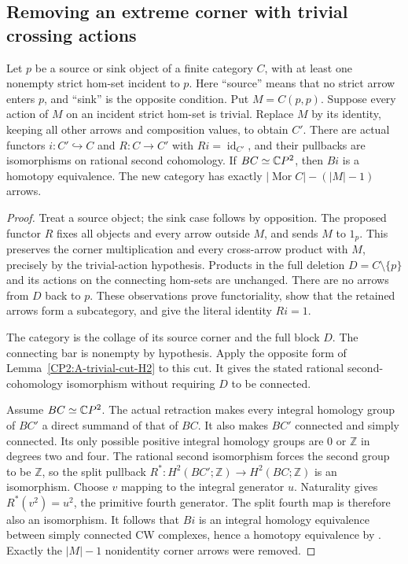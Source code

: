 \subsection{Removing an extreme corner with trivial crossing actions}

\begin{theorem}
\label{CP2:A-trivial-extreme-corner-retract}
Let $p$ be a source or sink object of a finite category $C$,
with at least one nonempty strict hom-set incident to $p$.
Here ``source'' means that no strict arrow enters $p$, and
``sink'' is the opposite condition. Put $M=C(p,p)$.
Suppose every action of $M$ on an incident strict hom-set
is trivial. Replace $M$ by its identity, keeping all other
arrows and composition values, to obtain $C'$. There are
actual functors $i:C'\hookrightarrow C$ and $R:C\to C'$
with $Ri=\operatorname{id}_{C'}$, and their pullbacks are
isomorphisms on rational second cohomology. If
$BC\simeq\mathbb{C}P^2$, then $Bi$ is a homotopy equivalence.
The new category has exactly $|\operatorname{Mor}C|-(|M|-1)$
arrows.
\end{theorem}
\begin{proof}
Treat a source object; the sink case follows by opposition.
The proposed functor $R$ fixes all objects and every arrow
outside $M$, and sends $M$ to $1_p$. This preserves the
corner multiplication and every cross-arrow product with
$M$, precisely by the trivial-action hypothesis. Products
in the full deletion $D=C\setminus\{p\}$ and its actions
on the connecting hom-sets are unchanged. There are no
arrows from $D$ back to $p$. These observations prove
functoriality, show that the retained arrows form a
subcategory, and give the literal identity $Ri=1$.

The category is the collage of its source corner and the
full block $D$. The connecting bar is nonempty by hypothesis.
Apply the opposite form of Lemma~\ref{CP2:A-trivial-cut-H2}
to this cut. It gives the stated rational second-cohomology
isomorphism without requiring $D$ to be connected.

Assume $BC\simeq\mathbb{C}P^2$. The actual retraction makes every
integral homology group of $BC'$ a direct summand of that
of $BC$. It also makes $BC'$ connected and simply connected.
Its only possible positive integral homology groups are
$0$ or $\mathbb Z$ in degrees two and four. The rational
second isomorphism forces the second group to be $\mathbb Z$,
so the split pullback $R^*:H^2(BC';\mathbb Z)\to
H^2(BC;\mathbb Z)$ is an isomorphism. Choose $v$ mapping
to the integral generator $u$. Naturality gives
$R^*(v^2)=u^2$, the primitive fourth generator. The split
fourth map is therefore also an isomorphism. It follows
that $Bi$ is an integral homology equivalence between
simply connected CW complexes, hence a homotopy equivalence
by \cite[Corollary~4.33]{CP2-Hatcher2002}. Exactly the
$|M|-1$ nonidentity corner arrows were removed.
\end{proof}

